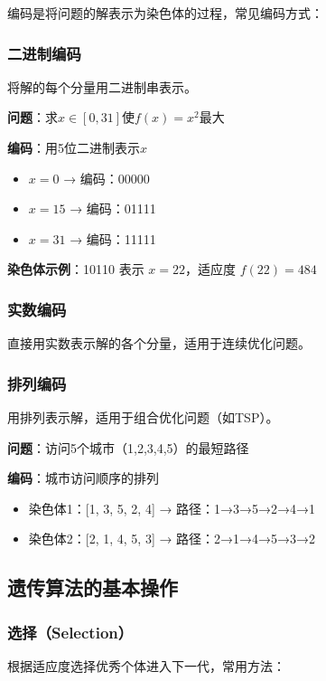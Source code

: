 编码是将问题的解表示为染色体的过程，常见编码方式：

\subsubsection{二进制编码}
将解的每个分量用二进制串表示。

\begin{examplebox}[例子：二进制编码]
\textbf{问题}：求$x \in [0, 31]$使$f(x) = x^2$最大

\textbf{编码}：用5位二进制表示$x$
\begin{itemize}[itemsep=0pt]
    \item $x = 0$ → 编码：00000
    \item $x = 15$ → 编码：01111
    \item $x = 31$ → 编码：11111
\end{itemize}

\textbf{染色体示例}：10110 表示 $x = 22$，适应度 $f(22) = 484$
\end{examplebox}

\subsubsection{实数编码}
直接用实数表示解的各个分量，适用于连续优化问题。

\subsubsection{排列编码}
用排列表示解，适用于组合优化问题（如TSP）。

\begin{examplebox}
\textbf{问题}：访问5个城市（1,2,3,4,5）的最短路径

\textbf{编码}：城市访问顺序的排列
\begin{itemize}[itemsep=0pt]
    \item 染色体1：[1, 3, 5, 2, 4] → 路径：1→3→5→2→4→1
    \item 染色体2：[2, 1, 4, 5, 3] → 路径：2→1→4→5→3→2
\end{itemize}
\end{examplebox}

\subsection{遗传算法的基本操作}

\subsubsection{选择（Selection）}
根据适应度选择优秀个体进入下一代，常用方法：

